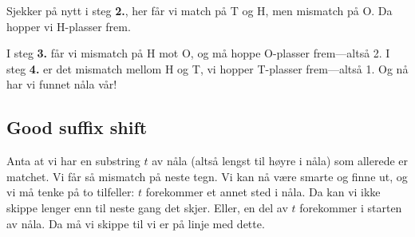 \begin{example}
	Sjekker på nytt i steg \textbf{2.}, her får vi match på T og H, men mismatch på O. Da hopper vi H-plasser frem.
	
	I steg \textbf{3.} får vi mismatch på H mot O, og må hoppe O-plasser frem---altså 2. I steg \textbf{4.} er det mismatch mellom H og T, vi hopper T-plasser frem---altså 1. Og nå har vi funnet nåla vår!
	
\end{example}


\subsection{Good suffix shift}
Anta at vi har en substring $t$ av nåla (altså lengst til høyre i nåla) som allerede er matchet. Vi får så mismatch på neste tegn. Vi kan nå være smarte og finne ut, og
vi må tenke på to tilfeller: $t$ forekommer et annet sted i nåla. Da kan vi ikke skippe lenger enn til neste gang det skjer. Eller, en del av $t$ forekommer i starten av nåla. Da må vi skippe til vi er på linje med dette.


